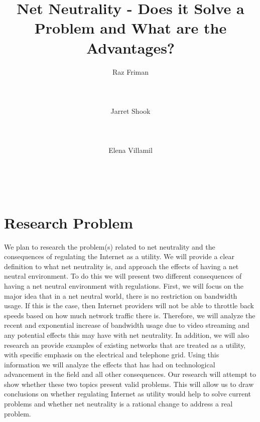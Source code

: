 \documentclass{sigcomm-alternate}
\begin{document}
\title{Net Neutrality - Does it Solve a Problem and What are the Advantages?}
	

\author{
	\alignauthor
	Raz Friman\\
	\\
	\\
	\\
	\alignauthor
	Jarret Shook\\
	\\
	\\
	\\
	\alignauthor Elena Villamil\\
	\\
	\\
	\\
}

\maketitle


\section{Research Problem}
We plan to research the problem(s) related to net neutrality and the consequences of regulating the Internet as a utility. We will provide a clear definition to what net neutrality is, and approach the effects of having a net neutral environment. To do this we will present two different consequences of having a net neutral environment with regulations. First, we will focus on the major idea that in a net neutral world, there is no restriction on bandwidth usage. If this is the case, then Internet providers will not be able to throttle back speeds based on how much network traffic there is. Therefore, we will analyze the recent and exponential increase of bandwidth usage due to video streaming and any potential effects this may have with net neutrality. In addition, we will also research an provide examples of existing networks that are treated as a utility, with specific emphasis on the electrical and telephone grid. Using this information we will analyze the effects that has had on technological advancement in the field and all other consequences. Our research will attempt to show whether these two topics present valid problems. This will allow us to draw conclusions on whether regulating Internet as utility would help to solve current problems and whether net neutrality is a rational change to address a real problem.
\end{document}
